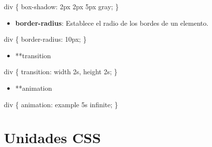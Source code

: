 \documentclass[
  a4paper,
  DIV=11,
  numbers=noendperiod,
  onepage,
  openany]{scrreprt}
\newenvironment{Shaded}{\begin{snugshade}}{\end{snugshade}}
\newcommand{\ConstantTok}[1]{\textcolor[rgb]{0.56,0.35,0.01}{#1}}
\newcommand{\DataTypeTok}[1]{\textcolor[rgb]{0.68,0.00,0.00}{#1}}
\newcommand{\DecValTok}[1]{\textcolor[rgb]{0.68,0.00,0.00}{#1}}
\newcommand{\KeywordTok}[1]{\textcolor[rgb]{0.00,0.23,0.31}{#1}}
\newcommand{\NormalTok}[1]{\textcolor[rgb]{0.00,0.23,0.31}{#1}}
\newcommand{\OperatorTok}[1]{\textcolor[rgb]{0.37,0.37,0.37}{#1}}
\providecommand{\tightlist}{%
  \setlength{\itemsep}{0pt}\setlength{\parskip}{0pt}}\usepackage{longtable,booktabs,array}
\begin{document}
\begin{Shaded}
\begin{Highlighting}[]
\NormalTok{div \{}
  \KeywordTok{box{-}shadow}\NormalTok{: }\DecValTok{2}\DataTypeTok{px} \DecValTok{2}\DataTypeTok{px} \DecValTok{5}\DataTypeTok{px} \ConstantTok{gray}\OperatorTok{;}
\NormalTok{\}}
\end{Highlighting}
\end{Shaded}

\begin{itemize}
\tightlist
\item
  \textbf{border-radius}: Establece el radio de los bordes de un
  elemento.
\end{itemize}

\begin{Shaded}
\begin{Highlighting}[]
\NormalTok{div \{}
  \KeywordTok{border{-}radius}\NormalTok{: }\DecValTok{10}\DataTypeTok{px}\OperatorTok{;}
\NormalTok{\}}
\end{Highlighting}
\end{Shaded}

\begin{itemize}
\tightlist
\item
  **transition
\end{itemize}

\begin{Shaded}
\begin{Highlighting}[]
\NormalTok{div \{}
  \KeywordTok{transition}\NormalTok{: width }\DecValTok{2}\DataTypeTok{s}\OperatorTok{,}\NormalTok{ height }\DecValTok{2}\DataTypeTok{s}\OperatorTok{;}
\NormalTok{\}}
\end{Highlighting}
\end{Shaded}

\begin{itemize}
\tightlist
\item
  **animation
\end{itemize}

\begin{Shaded}
\begin{Highlighting}[]
\NormalTok{div \{}
  \KeywordTok{animation}\NormalTok{: example }\DecValTok{5}\DataTypeTok{s} \DecValTok{infinite}\OperatorTok{;}
\NormalTok{\}}
\end{Highlighting}
\end{Shaded}

\section{Unidades CSS}\label{unidades-css}
\end{document}
